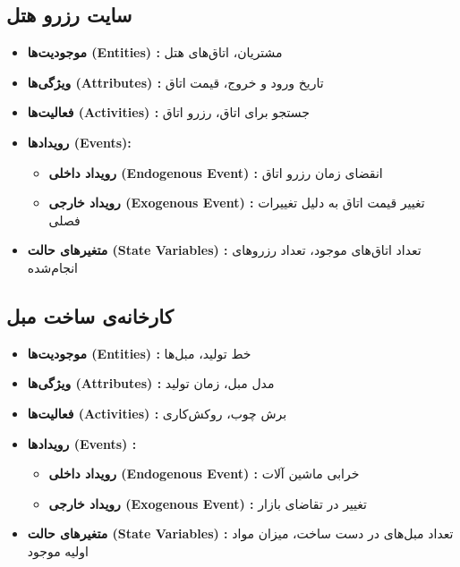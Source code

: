 \subsection*{سایت رزرو هتل}
\begin{itemize}
	\item \textbf{موجودیت‌ها (Entities) :} مشتریان، اتاق‌های هتل
	\item \textbf{ویژگی‌ها (Attributes) :} تاریخ ورود و خروج، قیمت اتاق
	\item \textbf{فعالیت‌ها (Activities) :} جستجو برای اتاق، رزرو اتاق
	\item \textbf{رویدادها (Events):}
	\begin{itemize}
		\item \textbf{رویداد داخلی (Endogenous Event) :} انقضای زمان رزرو اتاق
		\item \textbf{رویداد خارجی (Exogenous Event) :} تغییر قیمت اتاق به دلیل تغییرات فصلی
	\end{itemize}
	\item \textbf{متغیرهای حالت (State Variables) :} تعداد اتاق‌های موجود، تعداد رزروهای انجام‌شده
\end{itemize}

\subsection*{کارخانه‌ی ساخت مبل}
\begin{itemize}
	\item \textbf{موجودیت‌ها (Entities) :} خط تولید، مبل‌ها
	\item \textbf{ویژگی‌ها (Attributes) :} مدل مبل، زمان تولید
	\item \textbf{فعالیت‌ها (Activities) :} برش چوب، روکش‌کاری
	\item \textbf{رویدادها (Events) :}
	\begin{itemize}
		\item \textbf{رویداد داخلی (Endogenous Event) :} خرابی ماشین آلات
		\item \textbf{رویداد خارجی (Exogenous Event) :} تغییر در تقاضای بازار
	\end{itemize}
	\item \textbf{متغیرهای حالت (State Variables) :} تعداد مبل‌های در دست ساخت، میزان مواد اولیه موجود
\end{itemize}